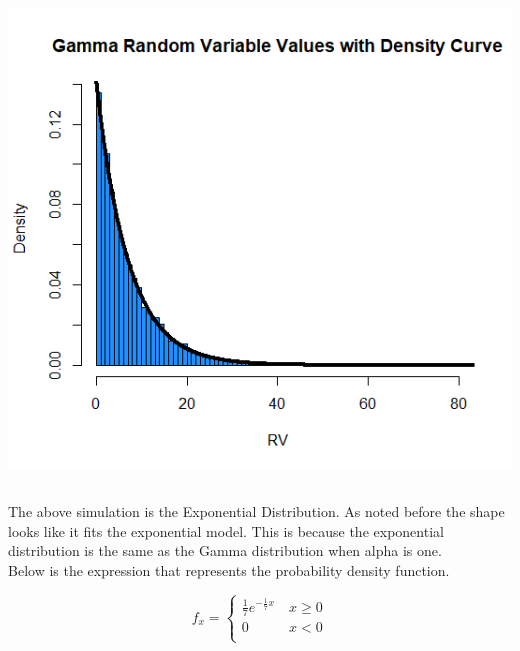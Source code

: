 \documentclass[letterpaper, onecolumn,10pt]{IEEEtran}
\begin{document}
		        \includegraphics{week2/GammaSimThree.png}
		        
            \subsection{}
                The above simulation is the Exponential Distribution. As noted before the shape looks like it fits the exponential model. This is because the exponential distribution is the same as the Gamma distribution when alpha is one.\\
                
                Below is the expression that represents the probability density function.
                
                \[
		        f_x =
		        \begin{cases}
		            \frac{1}{7}e^{-\frac{1}{7}x} &\  x \geq 0\\
		            0 &\ x < 0\\
		        \end{cases}
		        \]\\
                
                
		        
	
		
\end{document}
